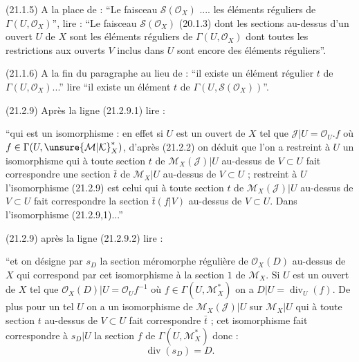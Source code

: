 (21.1.5) A la place de : ``Le faisceau $\mathscr S(\mathcal O_X)$ .... les éléments réguliers de $\Gamma(U,\mathcal O_X)$'', lire : ``Le faisceau $\mathscr S(\mathcal O_X)$ (20.1.3) dont les sections au-dessus d'un ouvert $U$ de $X$ sont les éléments réguliers de $\Gamma(U,\mathcal O_X)$ dont toutes les restrictions aux ouverts $V$ inclus dans $U$ sont encore des éléments réguliers''.

(21.1.6) A la fin du paragraphe au lieu de : ``il existe un élément régulier $t$ de $\Gamma(U,\mathcal O_X)$...'' lire ``il existe un élément  $t$ de $\Gamma(U,\mathscr S(\mathcal O_X))$''.

(21.2.9) Après la ligne (21.2.9.1) lire :

``qui est un isomorphisme : en effet si $U$ est un ouvert de $X$ tel que $\mathcal J|U=\mathcal O_U.f$ où $f\in\Gamma(U,{\unsure{\mathcal M|\mathcal K}}_X^*)$, d'après (21.2.2) on déduit que l'on a  restreint à $U$ un isomorphisme  qui à toute section $t$ de $\mathcal M_X(\mathcal J)|U$ au-dessus de $V\subset U$ fait correspondre une section $\bar t$ de $\mathcal M_X|U$ au-dessus de $V\subset U$ ; restreint à $U$ l'isomorphisme (21.2.9) est celui qui à toute section $t$ de $\mathcal M_X(\mathcal J)|U$ au-dessus de $V\subset U$ fait correspondre la section $\bar t(f|V)$ au-dessus de $V\subset U$. Dans l'isomorphisme (21.2.9,1)...''

(21.2.9) après la ligne (21.2.9.2) lire :

``et on désigne par $s_D$ la section méromorphe régulière de $\mathcal O_X(D)$ au-dessus de $X$ qui correspond par cet isomorphisme à la section $1$ de $\mathcal M_X$. Si $U$ est un ouvert de $X$ tel que $\mathcal O_X(D)|U=\mathcal O_U f^{-1}$ où $f\in\Gamma(U,\mathcal M_X^*)$  on a $D|U=\operatorname{div}_U(f)$. De plus pour un tel $U$ on a un isomorphisme de $\mathcal M_X(\mathcal J)|U$ sur $\mathcal M_X|U$ qui à toute section $t$ au-dessus de $V\subset U$ fait correspondre $\bar t$ ; cet isomorphisme fait correspondre à $s_D|U$ la section $f$ de $\Gamma(U,\mathcal M_X^*)$ donc :
\[
\operatorname{div}(s_D)=D.\tag*{(21,2.9.3)}
\]



